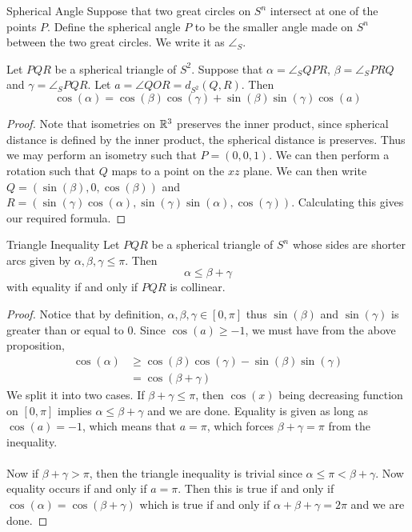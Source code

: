 \documentclass[a4paper]{article}
\begin{document}
\begin{defn}{Spherical Angle}{} Suppose that two great circles on $S^n$ intersect at one of the points $P$. Define the spherical angle $P$ to be the smaller angle made on $S^n$ between the two great circles. We write it as $\angle_S$. 
\end{defn}

\begin{prp}{}{} Let $PQR$ be a spherical triangle of $S^2$. Suppose that $\alpha=\angle_SQPR$, $\beta=\angle_SPRQ$ and $\gamma=\angle_S PQR$. Let $a=\angle QOR=d_{S^2}(Q,R)$. Then $$\cos(\alpha)=\cos(\beta)\cos(\gamma)+\sin(\beta)\sin(\gamma)\cos(a)$$\tcbline
\begin{proof}
Note that isometries on $\mathbb{R}^3$ preserves the inner product, since spherical distance is defined by the inner product, the spherical distance is preserves. Thus we may perform an isometry such that $P=(0,0,1)$. We can then perform a  rotation such that $Q$ maps to a point on the $xz$ plane. We can then write $Q=(\sin(\beta), 0, \cos(\beta))$ and $R=(\sin(\gamma)\cos(\alpha), \sin(\gamma)\sin(\alpha), \cos(\gamma))$. Calculating this gives our required formula. 
\end{proof}
\end{prp}

\begin{prp}{Triangle Inequality}{} Let $PQR$ be a spherical triangle of $S^n$ whose sides are shorter arcs given by $\alpha,\beta,\gamma\leq\pi$. Then $$\alpha\leq\beta+\gamma$$ with equality if and only if $PQR$ is collinear. \tcbline
\begin{proof}
Notice that by definition, $\alpha,\beta,\gamma\in[0,\pi]$ thus $\sin(\beta)$ and $\sin(\gamma)$ is greater than or equal to $0$. Since $\cos(a)\geq-1$, we must have from the above proposition, 
\begin{align*}
\cos(\alpha)&\geq\cos(\beta)\cos(\gamma)-\sin(\beta)\sin(\gamma)\\
&=\cos(\beta+\gamma)
\end{align*}
We split it into two cases. If $\beta+\gamma\leq\pi$, then $\cos(x)$ being decreasing function on $[0,\pi]$ implies $\alpha\leq\beta+\gamma$ and we are done. Equality is given as long as $\cos(a)=-1$, which means that $a=\pi$, which forces $\beta+\gamma=\pi$ from the inequality. \\~\\
Now if $\beta+\gamma>\pi$, then the triangle inequality is trivial since $\alpha\leq\pi<\beta+\gamma$. Now equality occurs if and only if $a=\pi$. Then this is true if and only if $\cos(\alpha)=\cos(\beta+\gamma)$ which is true if and only if $\alpha+\beta+\gamma=2\pi$ and we are done. 
\end{proof}
\end{prp}
\end{document}
